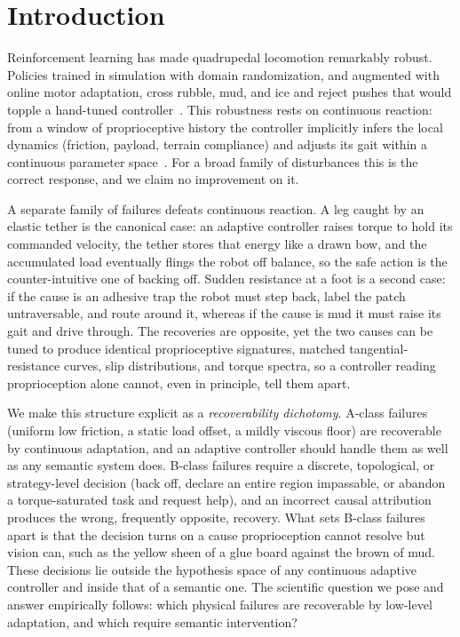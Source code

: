 \documentclass[conference]{IEEEtran}
\begin{document}
\section{Introduction}
\label{sec:intro}

Reinforcement learning has made quadrupedal locomotion remarkably robust.
Policies trained in simulation with domain randomization, and augmented with
online motor adaptation, cross rubble, mud, and ice and reject pushes that would
topple a hand-tuned controller~\cite{lee2020learning,miki2022learning,kumar2021rma,nahrendra2023dreamwaq}.
This robustness rests on continuous reaction: from a window of proprioceptive
history the controller implicitly infers the local dynamics (friction, payload,
terrain compliance) and adjusts its gait within a continuous parameter
space~\cite{kumar2021rma}. For a broad family of disturbances this is the
correct response, and we claim no improvement on it.

A separate family of failures defeats continuous reaction. A leg caught by an
elastic tether is the canonical case: an adaptive controller raises torque to
hold its commanded velocity, the tether stores that energy like a drawn bow, and
the accumulated load eventually flings the robot off balance, so the safe action
is the counter-intuitive one of backing off. Sudden resistance at a foot is a
second case: if the cause is an adhesive trap the robot must step back, label the
patch untraversable, and route around it, whereas if the cause is mud it must
raise its gait and drive through. The recoveries are opposite, yet the two causes
can be tuned to produce identical proprioceptive signatures, matched
tangential-resistance curves, slip distributions, and torque spectra, so a
controller reading proprioception alone cannot, even in principle, tell them
apart.

We make this structure explicit as a \emph{recoverability dichotomy}. A-class
failures (uniform low friction, a static load offset, a mildly viscous floor) are
recoverable by continuous adaptation, and an adaptive controller should handle
them as well as any semantic system does. B-class failures require a discrete,
topological, or strategy-level decision (back off, declare an entire region
impassable, or abandon a torque-saturated task and request help), and an
incorrect causal attribution produces the wrong, frequently opposite, recovery.
What sets B-class failures apart is that the decision turns on a cause
proprioception cannot resolve but vision can, such as the yellow sheen of a glue
board against the brown of mud. These decisions lie outside the hypothesis space
of any continuous adaptive controller and inside that of a semantic one. The
scientific question we pose and answer empirically follows: which physical
failures are recoverable by low-level adaptation, and which require semantic
intervention?
\end{document}
